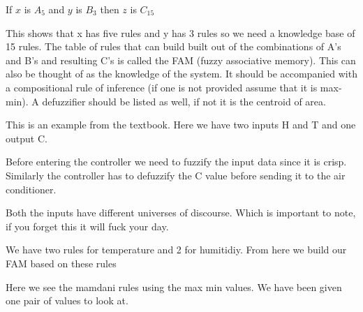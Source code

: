\documentclass{article}
\begin{document}
If $x$ is $A_5$ and $y$ is $B_3$ then $z$ is $C_15$

This shows that x has five rules and y has 3 rules so we need a knowledge base of 15 rules. The table of rules that can build built out of the combinations of A's and B's and resulting C's is called the FAM (fuzzy associative memory). This can also be thought of as the knowledge of the system. It should be accompanied with a compositional rule of inference (if one is not provided assume that it is max-min). A defuzzifier should be listed as well, if not it is the centroid of area.


This is an example from the textbook. Here we have two inputs H and T and one output C.

Before entering the controller we need to fuzzify the input data since it is crisp. Similarly the controller has to defuzzify the C value before sending it to the air conditioner.


Both the inputs have different universes of discourse. Which is important to note, if you forget this it will fuck your day.


We have two rules for temperature and 2 for humitidiy. From here we build our FAM based on these rules


Here we see the mamdani rules using the max min values. We have been given one pair of values to look at.
\end{document}
